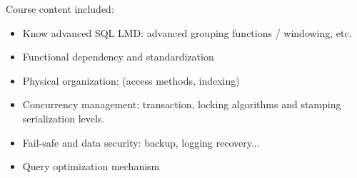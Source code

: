 Course content included:
\begin{itemize}
    \item Know advanced SQL LMD: advanced grouping functions / windowing, etc.
    \item Functional dependency and standardization
    \item Physical organization: (access methods, indexing)
    \item Concurrency management: transaction, locking algorithms and stamping serialization levels.
    \item Fail-safe and data security: backup, logging recovery...
    \item Query optimization mechanism
\end{itemize}